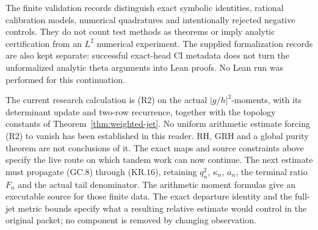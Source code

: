 The finite validation records distinguish exact symbolic
identities, rational calibration models, numerical quadratures
and intentionally rejected negative controls. They do not count
test methods as theorems or imply analytic certification from
an \(L^2\) numerical experiment. The supplied formalization records
are also kept separate: successful exact-head CI metadata
does not turn the unformalized analytic theta arguments into
Lean proofs. No Lean run was performed for this continuation.

The current research calculation is (R2) on the actual
\(|g/h|^2\)-moments, with its determinant update and two-row
recurrence, together with the topology constants of
Theorem~\ref{thm:weighted-jet}. No uniform arithmetic estimate
forcing (R2) to vanish has been established in this reader.
RH, GRH and a global purity theorem are not conclusions of it.
The exact maps and source constraints above specify the live
route on which tandem work can now continue.
The next estimate must propagate (GC.8) through (KR.16), retaining
\(q_n^2\), \(\kappa_n\), \(a_n\), the terminal ratio \(F_n\)
and the actual tail denominator. The arithmetic moment formulas
give an executable source for those finite data. The exact
departure identity and the full-jet metric bounds specify what
a resulting relative estimate would control in the original
packet; no component is removed by changing observation.

